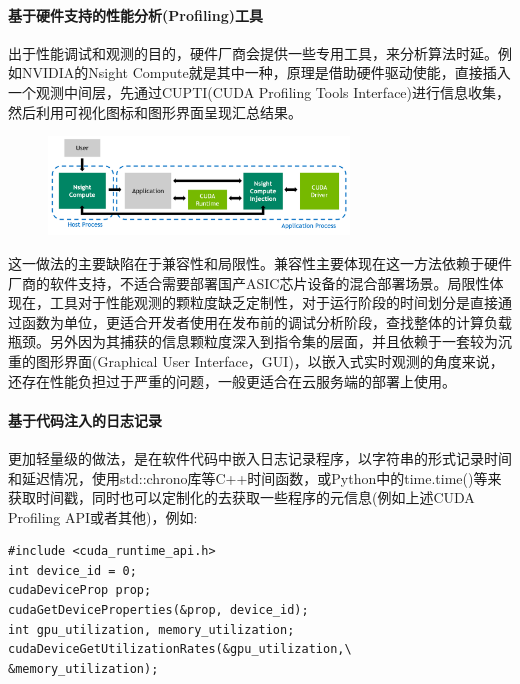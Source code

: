 \documentclass[master]{shtthesis}
\begin{document}
\paragraph{基于硬件支持的性能分析(Profiling)工具}

出于性能调试和观测的目的，硬件厂商会提供一些专用工具，来分析算法时延。例如NVIDIA的Nsight Compute\cite{yang2020hierarchical}就是其中一种，原理是借助硬件驱动使能，直接插入一个观测中间层，先通过CUPTI(CUDA Profiling Tools Interface)进行信息收集，然后利用可视化图标和图形界面呈现汇总结果。

\begin{figure}[htbp]
	\centering
	\includegraphics[width=8cm]{img/nsight.png}
	\label{NsightCompute的观测原理}
\end{figure}


这一做法的主要缺陷在于兼容性和局限性。兼容性主要体现在这一方法依赖于硬件厂商的软件支持，不适合需要部署国产ASIC芯片设备的混合部署场景。局限性体现在，工具对于性能观测的颗粒度缺乏定制性，对于运行阶段的时间划分是直接通过函数为单位，更适合开发者使用在发布前的调试分析阶段，查找整体的计算负载瓶颈。另外因为其捕获的信息颗粒度深入到指令集的层面，并且依赖于一套较为沉重的图形界面(Graphical User Interface，GUI)，以嵌入式实时观测的角度来说，还存在性能负担过于严重的问题，一般更适合在云服务端的部署上使用。

\paragraph{基于代码注入的日志记录}
更加轻量级的做法，是在软件代码中嵌入日志记录程序，以字符串的形式记录时间和延迟情况，使用std::chrono库等C++时间函数，或Python中的time.time()等来获取时间戳，同时也可以定制化的去获取一些程序的元信息(例如上述CUDA Profiling API或者其他)，例如:
\begin{lstlisting}[caption={使用CUDA Profiling API读取GPU状态信息},captionpos=b]
#include <cuda_runtime_api.h>
int device_id = 0;
cudaDeviceProp prop;
cudaGetDeviceProperties(&prop, device_id);
int gpu_utilization, memory_utilization;
cudaDeviceGetUtilizationRates(&gpu_utilization,\
&memory_utilization);
\end{lstlisting}
\end{document}
